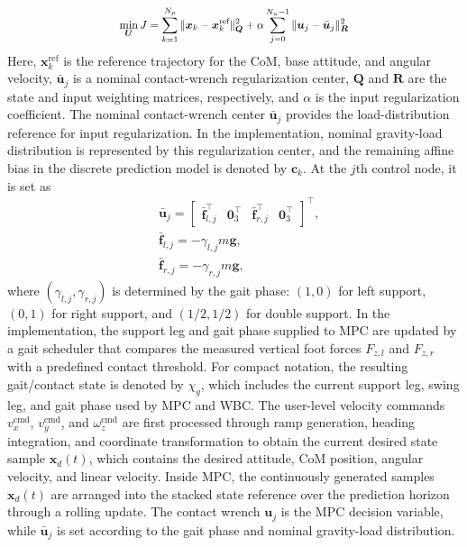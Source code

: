 \documentclass[5p,times]{elsarticle}
\begin{document}
\begin{equation}
\scalebox{0.88}{$\displaystyle
\min_{\bm U} J=\sum_{k=1}^{N_p}\|\bm x_k-\bm x_k^{\text{ref}}\|_{\bm Q}^2+
\alpha\sum_{j=0}^{N_u-1}\|\bm u_j-\bar{\bm u}_j\|_{\bm R}^2
$}
\label{eq:cost}
\end{equation}
Here, $\bm x_k^{\text{ref}}$ is the reference trajectory for the CoM, base attitude, and angular velocity, $\bar{\bm u}_j$ is a nominal contact-wrench regularization center, $\bm Q$ and $\bm R$ are the state and input weighting matrices, respectively, and $\alpha$ is the input regularization coefficient. The nominal contact-wrench center $\bar{\bm u}_j$ provides the load-distribution reference for input regularization. In the implementation, nominal gravity-load distribution is represented by this regularization center, and the remaining affine bias in the discrete prediction model is denoted by $\bm c_k$. At the $j$th control node, it is set as
\begin{equation}
\begin{aligned}
&\bar{\bm u}_j=
\begin{bmatrix}
\bar{\bm f}_{l,j}^{\top}&\bm 0_3^{\top}&
\bar{\bm f}_{r,j}^{\top}&\bm 0_3^{\top}
\end{bmatrix}^{\top},
\\
&\bar{\bm f}_{l,j}=
-\gamma_{l,j}m\bm g,
\\
&\bar{\bm f}_{r,j}=
-\gamma_{r,j}m\bm g,
\end{aligned}
\label{eq:nominal_wrench}
\end{equation}
where $(\gamma_{l,j},\gamma_{r,j})$ is determined by the gait phase: $(1,0)$ for left support, $(0,1)$ for right support, and $(1/2,1/2)$ for double support. In the implementation, the support leg and gait phase supplied to MPC are updated by a gait scheduler that compares the measured vertical foot forces $F_{z,l}$ and $F_{z,r}$ with a predefined contact threshold. For compact notation, the resulting gait/contact state is denoted by $\chi_g$, which includes the current support leg, swing leg, and gait phase used by MPC and WBC. The user-level velocity commands $v_x^{\mathrm{cmd}}$, $v_y^{\mathrm{cmd}}$, and $\omega_z^{\mathrm{cmd}}$ are first processed through ramp generation, heading integration, and coordinate transformation to obtain the current desired state sample $\bm x_d(t)$, which contains the desired attitude, CoM position, angular velocity, and linear velocity. Inside MPC, the continuously generated samples $\bm x_d(t)$ are arranged into the stacked state reference over the prediction horizon through a rolling update. The contact wrench $\bm u_j$ is the MPC decision variable, while $\bar{\bm u}_j$ is set according to the gait phase and nominal gravity-load distribution.
\end{document}
